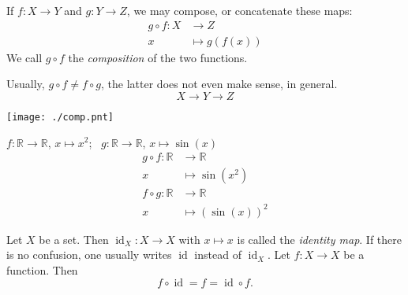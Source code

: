 


\begin{Definition}{}
If $f:X \to Y$ and $g : Y\to Z$, we may compose, or concatenate these maps:
\begin{align*}
 g \circ f : X &\to  Z\\
            x &\mapsto g(f(x))
\end{align*}
We call $g \circ f$ the \emph{composition} of the two functions.
\end{Definition}

Usually, $g\circ f \neq f\circ g$, the latter does not even make sense, in general. 
\[
 X \to Y \to Z
\]

\texttt{[image: ./comp.pnt]}

\begin{example}{} \label{Bsp:Komposition}
\item $f: \mathbb{R} \rightarrow \mathbb{R}$, $x\mapsto x^2$;~ $g:\mathbb{R} \rightarrow \mathbb{R}$, $x\mapsto \sin(x)$
\begin{align*}
g\circ f: \mathbb{R} &\rightarrow \mathbb{R} \\
x &\mapsto \sin(x^2) \\
f\circ g: \mathbb{R} &\rightarrow \mathbb{R} \\
x &\mapsto (\sin(x))^2
\end{align*}
\item Let $X$ be a set. Then $\operatorname{id}_X: X\rightarrow X$ with $x\mapsto x$ is called the \emph{identity map}.
If there is no confusion, one usually writes $\operatorname{id}$ instead of $\operatorname{id}_X$. 
Let $f: X\rightarrow X$ be a function. Then
\[
    f\circ \operatorname{id}=f=\operatorname{id}\circ f.
\]
\end{example}

